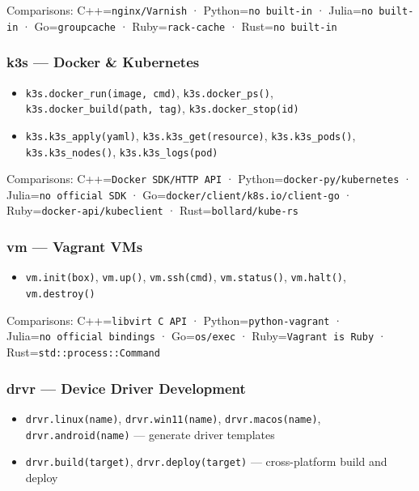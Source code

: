 \documentclass[
]{article}
\providecommand{\tightlist}{%
  \setlength{\itemsep}{0pt}\setlength{\parskip}{0pt}}
\begin{document}
Comparisons: C++=\texttt{nginx/Varnish} · Python=\texttt{no\ built-in} ·
Julia=\texttt{no\ built-in} · Go=\texttt{groupcache} ·
Ruby=\texttt{rack-cache} · Rust=\texttt{no\ built-in}

\subsubsection{k3s --- Docker \&
Kubernetes}\label{k3s-docker-kubernetes}

\begin{itemize}
\tightlist
\item
  \texttt{k3s.docker\_run(image,\ cmd)}, \texttt{k3s.docker\_ps()},
  \texttt{k3s.docker\_build(path,\ tag)}, \texttt{k3s.docker\_stop(id)}
\item
  \texttt{k3s.k3s\_apply(yaml)}, \texttt{k3s.k3s\_get(resource)},
  \texttt{k3s.k3s\_pods()}, \texttt{k3s.k3s\_nodes()},
  \texttt{k3s.k3s\_logs(pod)}
\end{itemize}

Comparisons: C++=\texttt{Docker\ SDK/HTTP\ API} ·
Python=\texttt{docker-py/kubernetes} · Julia=\texttt{no\ official\ SDK}
· Go=\texttt{docker/client/k8s.io/client-go} ·
Ruby=\texttt{docker-api/kubeclient} · Rust=\texttt{bollard/kube-rs}

\subsubsection{vm --- Vagrant VMs}\label{vm-vagrant-vms}

\begin{itemize}
\tightlist
\item
  \texttt{vm.init(box)}, \texttt{vm.up()}, \texttt{vm.ssh(cmd)},
  \texttt{vm.status()}, \texttt{vm.halt()}, \texttt{vm.destroy()}
\end{itemize}

Comparisons: C++=\texttt{libvirt\ C\ API} ·
Python=\texttt{python-vagrant} · Julia=\texttt{no\ official\ bindings} ·
Go=\texttt{os/exec} · Ruby=\texttt{Vagrant\ is\ Ruby} ·
Rust=\texttt{std::process::Command}

\subsubsection{drvr --- Device Driver
Development}\label{drvr-device-driver-development}

\begin{itemize}
\tightlist
\item
  \texttt{drvr.linux(name)}, \texttt{drvr.win11(name)},
  \texttt{drvr.macos(name)}, \texttt{drvr.android(name)} --- generate
  driver templates
\item
  \texttt{drvr.build(target)}, \texttt{drvr.deploy(target)} ---
  cross-platform build and deploy
\end{itemize}
\end{document}

